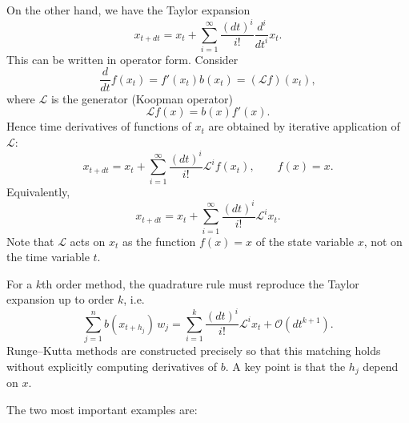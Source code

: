 \documentclass[11pt]{article}
\begin{document}
On the other hand, we have the Taylor expansion 
\begin{equation}
x_{t + dt} 
=
x_t 
+
\sum_{i=1}^{\infty}
\frac{(dt)^i}{i!}
\frac{d^i}{dt^i}x_t.
\end{equation}
This can be written in operator form. Consider 
\begin{equation}
\frac{d}{dt} f(x_t) 
= f'(x_t)b(x_t) 
= ({\mathcal L} f)(x_t),
\end{equation}
where ${\mathcal L}$ is the generator (Koopman operator)
\begin{equation}
{\mathcal L} f(x) = b(x) f'(x).
\end{equation}
Hence time derivatives of functions of $x_t$ are obtained by iterative application of ${\mathcal L}$:
\begin{equation}
x_{t + dt} 
=
x_t 
+
\sum_{i=1}^{\infty}
\frac{(dt)^i}{i!}
{\mathcal L}^i f(x_t),
\qquad
f(x)=x.
\end{equation}
Equivalently,
\begin{equation}
x_{t + dt} 
=
x_t 
+
\sum_{i=1}^{\infty}
\frac{(dt)^i}{i!}
{\mathcal L}^i x_t.
\end{equation}
Note that ${\mathcal L}$ acts on $x_t$ as the function $f(x)=x$ of the state variable $x$, not on the time variable $t$.

For a $k$th order method, the quadrature rule must reproduce the Taylor expansion up to order $k$, i.e.
\begin{equation}
\sum_{j=1}^n b(x_{t+h_j})\, w_j
=
\sum_{i=1}^{k}
\frac{(dt)^i}{i!}
{\mathcal L}^i x_t
+
\mathcal O(dt^{k+1}).
\end{equation}
Runge--Kutta methods are constructed precisely so that this matching holds without explicitly computing derivatives of $b$. A key point is that the $h_j$ depend on $x$. 

\medskip

The two most important examples are:
\end{document}
